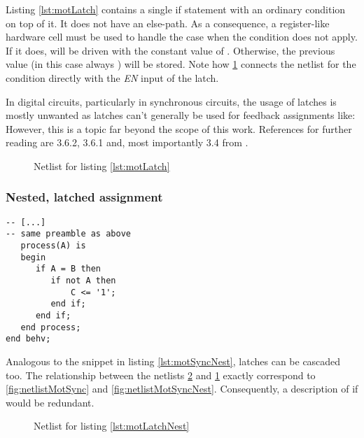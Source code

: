 Listing \ref{lst:motLatch} contains a single if statement with an
ordinary condition on top of it. It does not have an else-path. As a
consequence, a register-like hardware cell must be used to handle the
case when the condition  does not apply. If it does, 
will be driven with the constant value of . Otherwise, the
previous value (in this case always ) will be stored. Note how
\ref{fig:netlistMotLatch} connects the netlist for the condition
directly with the \emph{EN} input of the latch.

In digital circuits, particularly in synchronous circuits, the usage
of latches is mostly unwanted as latches can't generally be used for
feedback assignments like: 
However, this is a topic far beyond the scope of this work. References
for further reading are 3.6.2, 3.6.1 and, most importantly 3.4 from
\cite{VHDLSYNTHESE}.

\begin{figure}[p]
    \centering
    \caption{Netlist for listing \ref{lst:motLatch}}
    
    \label{fig:netlistMotLatch}
\end{figure}

\subsubsection{Nested, latched assignment}
\leavevmode\begin{lstlisting}[style=vhdl, caption={Code for a nested latched bit
      assignment}, label={lst:motLatchNest}]
-- [...]
-- same preamble as above
   process(A) is
   begin
      if A = B then
         if not A then
             C <= '1';
         end if;
      end if;
   end process;
end behv;
\end{lstlisting}
%
Analogous to the snippet in listing \ref{lst:motSyncNest}, latches can
be cascaded too. The relationship between the netlists
\ref{fig:netlistMotLatchNest} and
\ref{fig:netlistMotLatch} exactly correspond to
\ref{fig:netlistMotSync} and
\ref{fig:netlistMotSyncNest}. Consequently, a description of if would
be redundant.

\begin{figure}[p]
    \centering
    \caption{Netlist for listing \ref{lst:motLatchNest}}
    
    \label{fig:netlistMotLatchNest}
\end{figure}

